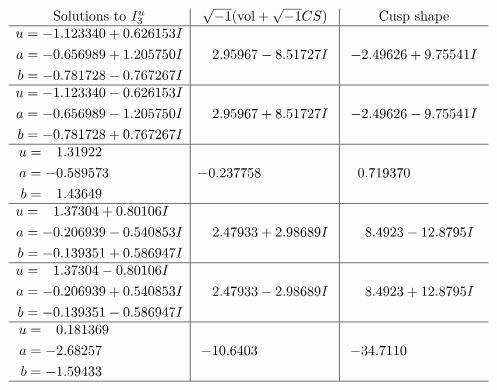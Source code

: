 \documentclass[1p]{elsarticle_modified}
\theoremstyle{definition}
\newcommand{\I}{\sqrt{-1}}
\begin{document}
$$\begin{array}{c|c|c}  
\text{Solutions to }I^u_{3}& \I (\text{vol} + \sqrt{-1}CS) & \text{Cusp shape}\\
 \hline 
\begin{aligned}
u &= -1.123340 + 0.626153 I \\
a &= -0.656989 + 1.205750 I \\
b &= -0.781728 - 0.767267 I\end{aligned}
 & \phantom{-}2.95967 - 8.51727 I & -2.49626 + 9.75541 I \\ \hline\begin{aligned}
u &= -1.123340 - 0.626153 I \\
a &= -0.656989 - 1.205750 I \\
b &= -0.781728 + 0.767267 I\end{aligned}
 & \phantom{-}2.95967 + 8.51727 I & -2.49626 - 9.75541 I \\ \hline\begin{aligned}
u &= \phantom{-}1.31922\phantom{ +0.000000I} \\
a &= -0.589573\phantom{ +0.000000I} \\
b &= \phantom{-}1.43649\phantom{ +0.000000I}\end{aligned}
 & -0.237758\phantom{ +0.000000I} & \phantom{-}0.719370\phantom{ +0.000000I} \\ \hline\begin{aligned}
u &= \phantom{-}1.37304 + 0.80106 I \\
a &= -0.206939 - 0.540853 I \\
b &= -0.139351 + 0.586947 I\end{aligned}
 & \phantom{-}2.47933 + 2.98689 I & \phantom{-}8.4923 - 12.8795 I \\ \hline\begin{aligned}
u &= \phantom{-}1.37304 - 0.80106 I \\
a &= -0.206939 + 0.540853 I \\
b &= -0.139351 - 0.586947 I\end{aligned}
 & \phantom{-}2.47933 - 2.98689 I & \phantom{-}8.4923 + 12.8795 I \\ \hline\begin{aligned}
u &= \phantom{-}0.181369\phantom{ +0.000000I} \\
a &= -2.68257\phantom{ +0.000000I} \\
b &= -1.59433\phantom{ +0.000000I}\end{aligned}
 & -10.6403\phantom{ +0.000000I} & -34.7110\phantom{ +0.000000I}\\
 \hline 
 \end{array}$$\newpage\newpage\renewcommand{\arraystretch}{1}
\end{document}
